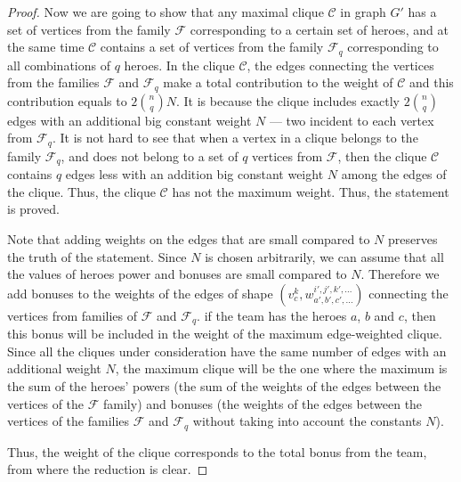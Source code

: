 \documentclass{article}
\begin{document}
\begin{proof}
     Now we are going to show that any maximal clique $\mathcal{C}$ in graph $G'$ has a set of vertices from the family $\mathcal{F}$ corresponding to a certain set of heroes, and at the same time $\mathcal{C}$ contains a set of vertices from the family $ \mathcal{F}_q $ corresponding to all combinations of $q$ heroes. In the clique $\mathcal{C}$, the edges connecting the vertices from the families $ \mathcal{F} $ and $ \mathcal{F}_q $ make a total contribution to the weight of $\mathcal{C}$ and this contribution equals to $ 2 \binom{n}{q} N $. It is because the clique includes exactly $ 2 \binom{n}{q} $ edges with an additional big constant weight $N$ --- two incident to each vertex from $ \mathcal {F}_q $.  It is not hard to see that when a vertex in a clique belongs to the family $ \mathcal{F}_q $, and does not belong to a set of $q$ vertices from $ \mathcal {F} $, then the clique $\mathcal{C}$ contains $q$ edges less with an addition big constant weight $ N $ among the edges of the clique. Thus, the clique $\mathcal{C}$ has not the maximum weight. Thus, the statement is proved. 
    
    Note that adding weights on the edges that are small compared to $N$ preserves the truth of the statement. Since $N$ is chosen arbitrarily, we can assume that all the values of heroes power and bonuses are small compared to $N$.
	Therefore we add bonuses to the weights of the edges of shape $ (v_c^{k}, w_{a', b', c', ...} ^ {i', j', k', ...}) $ connecting the vertices from families of $\mathcal{F} $ and $ \mathcal{F}_q $. if the  team has the heroes $a$, $b$ and $c$, then this bonus will be included in the weight of the maximum edge-weighted clique. Since all the cliques under consideration have the same number of edges with an additional weight $N$, the maximum clique will be the one where the maximum is the sum of the heroes' powers (the sum of the weights of the edges between the vertices of the $ \mathcal{F} $ family) and bonuses (the weights of the edges between the vertices of the families $ \mathcal{F} $ and $ \mathcal {F}_q $ without taking into account the constants $ N $).
    
Thus, the weight of the clique corresponds to the total bonus from the team, from where the reduction is clear.
    
\end{proof}

\end{document}
